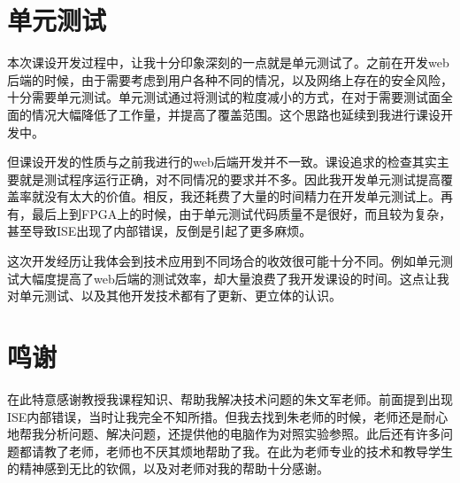 \documentclass[main.tex]{subfiles}
\begin{document}
\section{单元测试}
本次课设开发过程中，让我十分印象深刻的一点就是单元测试了。之前在开发web后端的时候，由于需要考虑到用户各种不同的情况，以及网络上存在的安全风险，十分需要单元测试。单元测试通过将测试的粒度减小的方式，在对于需要测试面全面的情况大幅降低了工作量，并提高了覆盖范围。这个思路也延续到我进行课设开发中。

但课设开发的性质与之前我进行的web后端开发并不一致。课设追求的检查其实主要就是测试程序运行正确，对不同情况的要求并不多。因此我开发单元测试提高覆盖率就没有太大的价值。相反，我还耗费了大量的时间精力在开发单元测试上。再有，最后上到FPGA上的时候，由于单元测试代码质量不是很好，而且较为复杂，甚至导致ISE出现了内部错误，反倒是引起了更多麻烦。

这次开发经历让我体会到技术应用到不同场合的收效很可能十分不同。例如单元测试大幅度提高了web后端的测试效率，却大量浪费了我开发课设的时间。这点让我对单元测试、以及其他开发技术都有了更新、更立体的认识。

\section{鸣谢}
在此特意感谢教授我课程知识、帮助我解决技术问题的朱文军老师。前面提到出现ISE内部错误，当时让我完全不知所措。但我去找到朱老师的时候，老师还是耐心地帮我分析问题、解决问题，还提供他的电脑作为对照实验参照。此后还有许多问题都请教了老师，老师也不厌其烦地帮助了我。在此为老师专业的技术和教导学生的精神感到无比的钦佩，以及对老师对我的帮助十分感谢。
\end{document}
